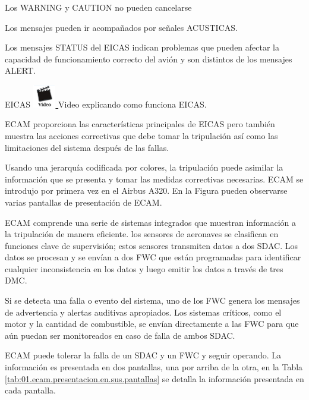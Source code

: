 Los WARNING y CAUTION no pueden cancelarse

Los mensajes pueden ir acompañados por
señales ACUSTICAS.

Los mensajes STATUS del EICAS indican problemas
que pueden afectar la capacidad de funcionamiento correcto
del avión y son distintos de los mensajes ALERT.

\begin{myboxAzul}{EICAS}
  \href{https://www.youtube.com/watch?v=wSgB9FoSR5E}{
    \includegraphics[height=1cm]{imagenes.iconos/video.jpg}
  } Video explicando como funciona EICAS.
\end{myboxAzul}

ECAM proporciona las características principales de EICAS pero también muestra las acciones correctivas que debe tomar la tripulación así como las limitaciones del sistema después de las fallas. 

Usando una jerarquía codificada por colores, la tripulación puede asimilar la información que se presenta y tomar las medidas correctivas necesarias. 
ECAM se introdujo por primera vez en el Airbus A320. En la Figura pueden observarse varias pantallas de presentaci\'on de ECAM.

ECAM comprende una serie de sistemas integrados que muestran información a la tripulación de manera eficiente. los sensores de aeronaves se clasifican en funciones clave de supervisión; estos sensores transmiten datos a dos \ac{SDAC}. Los datos se procesan y se envían a dos  \ac{FWC} que están programadas para identificar cualquier inconsistencia en los datos y luego emitir los datos a través de tres \ac{DMC}.

Si se detecta una falla o evento del sistema, uno de los FWC genera los mensajes de advertencia y alertas auditivas apropiados. Los sistemas críticos, como el motor y la cantidad de combustible, se env\'ian directamente a las FWC para que aún puedan ser monitoreados en caso de falla de ambos SDAC. 

ECAM puede tolerar la falla de un SDAC y un FWC y seguir operando. La informaci\'on es presentada en dos pantallas, una por arriba de la otra, en la Tabla \ref{tab:01.ecam.presentacion.en.sus.pantallas} se detalla la informaci\'on presentada en cada pantalla.

